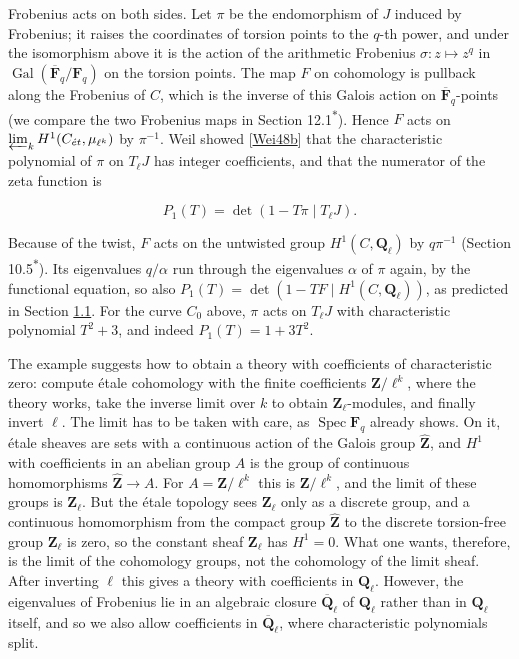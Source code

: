 \documentclass[11pt]{article}
\newcommand{\bpout}[1]{#1\textsuperscript{\hyperlink{bp-outside}{\ensuremath{\ast}}}}
\begin{document}
Frobenius acts on both sides. Let \(\pi\) be the endomorphism of \(J\) induced by Frobenius; it raises the coordinates of torsion points to the \(q\)-th power, and under the isomorphism above it is the action of the arithmetic Frobenius \(\sigma:z\mapsto z^q\) in \(\operatorname{Gal}(\overline{\mathbf F}_q/\mathbf F_q)\) on the torsion points. The map \(F\) on cohomology is pullback along the Frobenius of \(C\), which is the inverse of this Galois action on \(\overline{\mathbf F}_q\)-points (we compare the two Frobenius maps in Section \bpout{12.1}). Hence \(F\) acts on \(\varprojlim_kH^1(C_{\acute{e}t},\mu_{\ell^k})\) by \(\pi^{-1}\). Weil showed [\hyperref[bp25]{Wei48b}] that the characteristic polynomial of \(\pi\) on \(T_\ell J\) has integer coefficients, and that the numerator of the zeta function is

\[
P_1(T)=\det(1-T\pi\mid T_\ell J).
\]

Because of the twist, \(F\) acts on the untwisted group \(H^1(C,\mathbf Q_\ell)\) by \(q\pi^{-1}\) (Section \bpout{10.5}). Its eigenvalues \(q/\alpha\) run through the eigenvalues \(\alpha\) of \(\pi\) again, by the functional equation, so also \(P_1(T)=\det(1-TF\mid H^1(C,\mathbf Q_\ell))\), as predicted in Section \hyperref[bp3]{1.1}. For the curve \(C_0\) above, \(\pi\) acts on \(T_\ell J\) with characteristic polynomial \(T^2+3\), and indeed \(P_1(T)=1+3T^2\).

The example suggests how to obtain a theory with coefficients of characteristic zero: compute étale cohomology with the finite coefficients \(\mathbf Z/\ell^k\), where the theory works, take the inverse limit over \(k\) to obtain \(\mathbf Z_\ell\)-modules, and finally invert \(\ell\). The limit has to be taken with care, as \(\operatorname{Spec}\mathbf F_q\) already shows. On it, étale sheaves are sets with a continuous action of the Galois group \(\widehat{\mathbf Z}\), and \(H^1\) with coefficients in an abelian group \(A\) is the group of continuous homomorphisms \(\widehat{\mathbf Z}\to A\). For \(A=\mathbf Z/\ell^k\) this is \(\mathbf Z/\ell^k\), and the limit of these groups is \(\mathbf Z_\ell\). But the étale topology sees \(\mathbf Z_\ell\) only as a discrete group, and a continuous homomorphism from the compact group \(\widehat{\mathbf Z}\) to the discrete torsion-free group \(\mathbf Z_\ell\) is zero, so the constant sheaf \(\mathbf Z_\ell\) has \(H^1=0\). What one wants, therefore, is the limit of the cohomology groups, not the cohomology of the limit sheaf. After inverting \(\ell\) this gives a theory with coefficients in \(\mathbf Q_\ell\). However, the eigenvalues of Frobenius lie in an algebraic closure \(\overline{\mathbf Q}_\ell\) of \(\mathbf Q_\ell\) rather than in \(\mathbf Q_\ell\) itself, and so we also allow coefficients in \(\overline{\mathbf Q}_\ell\), where characteristic polynomials split.
\end{document}
